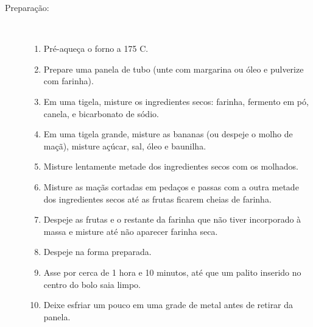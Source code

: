 \documentclass [11pt, letterpaper] {article}
\begin{document}
\begin {description}
\item [Preparação:] \ \newline
\begin {enumerate}
\item Pré-aqueça o forno a 175 C.
\item Prepare uma panela de tubo (unte com margarina ou \'oleo e pulverize com farinha).
\item Em uma tigela, misture os ingredientes secos: farinha, fermento em p\'o, canela,
e bicarbonato de sódio.
\item Em uma tigela grande, misture as bananas (ou despeje o molho de maçã), misture
açúcar, sal, óleo e baunilha.
\item Misture lentamente metade dos ingredientes secos com os molhados.
\item Misture as maçãs cortadas em pedaços e passas com a outra metade dos ingredientes secos at\'e as frutas ficarem cheias de farinha.
\item Despeje as frutas e o restante da farinha que n\~ao tiver incorporado \`a massa e misture at\'e n\~ao aparecer farinha seca.
\item Despeje na forma preparada.
\item Asse por cerca de 1 hora e 10 minutos, até que um palito inserido
no centro do bolo saia limpo.
\item Deixe esfriar um pouco em uma grade de metal antes de retirar da panela.
\end {enumerate}
\end {description}
\end{document}
